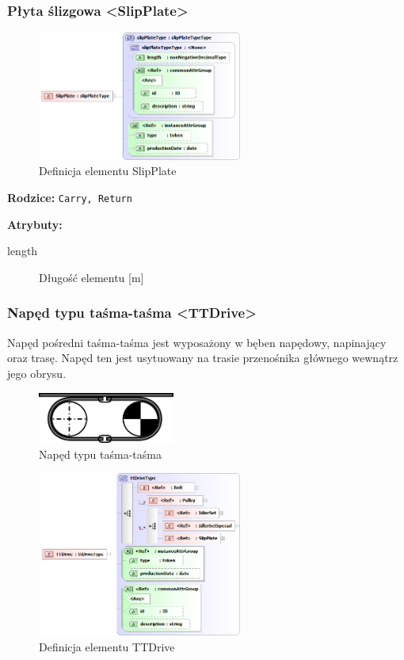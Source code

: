 \documentclass[12pt,a4paper]{article}
\begin{document}
\subsubsection{Płyta ślizgowa <SlipPlate>}

\begin{figure}[H]
  \centering
  \includegraphics[width=0.6\textwidth]{png/liquid/SlipPlate}
  \caption{Definicja elementu SlipPlate}
  \label{fig:slipPlate-xsd}
\end{figure}

\noindent\textbf{Rodzice:} \texttt{Carry, Return}

\noindent\textbf{Atrybuty:}
\begin{description}
\item[length] Długość elementu [m]
\end{description}


\subsubsection{Napęd typu taśma-taśma <TTDrive>}
Napęd pośredni taśma-taśma jest wyposażony w bęben napędowy, napinający oraz
trasę.  Napęd ten jest usytuowany na trasie przenośnika głównego wewnątrz jego
obrysu.

\begin{figure}[H]
  \centering
  \includegraphics[width=0.4\textwidth]{png/naped_tt}
  \caption{Napęd typu taśma-taśma}
  \label{fig:ttDrive-drw}
\end{figure}

\begin{figure}[H]
  \centering
  \includegraphics[width=0.6\textwidth]{png/liquid/TTDrive}
  \caption{Definicja elementu TTDrive}
  \label{fig:ttDrive-xsd}
\end{figure}
\end{document}
